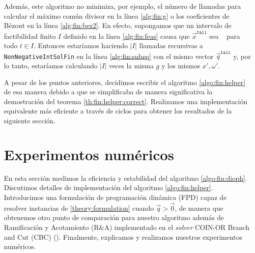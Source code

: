 Además, este algoritmo no minimiza, por ejemplo, el número de llamadas para calcular el máximo común
divisor en la línea \ref{alg:fin:g} o los coeficientes de Bézout en la línea \ref{alg:fin:bez2}. En
efecto, supongamos que un intervalo de factibilidad finito $I$ definido en la línea
\ref{alg:fin:feas} causa que $\vec{x}^{\texttt{tail}}$ sea \NIL~ para todo $t \in I$. Entonces
estaríamos haciendo $|I|$ llamadas recursivas a \texttt{NonNegativeIntSolFin} en la línea
\ref{alg:fin:subeq} con el mismo vector $\vec{q}^{\texttt{tail}}$ y, por lo tanto, estaríamos
calculando $|I|$ veces la misma $g$ y los mismos $x', \omega'$.

A pesar de los puntos anteriores, decidimos escribir el algoritmo \ref{algo:fin:helper} de esa
manera debido a que se simplificaba de manera significativa la demostración del teorema
\ref{th:fin:helper:correct}. Realizamos una implementación equivalente más eficiente a través de
ciclos para obtener los resultados de la siguiente sección.

\begin{algorithm}[ht]
	\LinesNumbered
	\caption{\texttt{Dioph}}
	\label{algo:fin:dioph}
\end{algorithm}

\newpage
\section{Experimentos numéricos}
\label{sec:fin:ex}
\noindent
En esta sección medimos la eficiencia y estabilidad del algoritmo \ref{algo:fin:dioph}. Discutimos
detalles de implementación del algoritmo \ref{algo:fin:helper}. Introducimos una formulación de
programación dinámica (FPD) capaz de resolver instancias de \eqref{theory:formulation} cuando
$\vec{q} > \vec{0}$, de manera que obtenemos otro punto de comparación para nuestro algoritmo además
de Ramificación y Acotamiento (R\&A) implementado en el \textit{solver} COIN-OR Branch and Cut
(CBC) (\cite{coin}). Finalmente, explicamos y realizamos nuestros experimentos numéricos.

